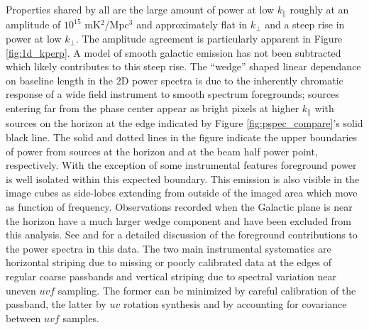 \documentclass[twolcolumn,iop]{emulateapj}
\begin{document}
Properties shared by all are the large amount of power at low $k_{\parallel}$ roughly at an amplitude of $10^{15}$ mK$^2$/Mpc$^3$ and approximately flat in $k_{\perp}$ and a steep rise in power at low $k_\perp$. The amplitude agreement is particularly apparent in Figure \ref{fig:1d_kperp}. A model of smooth galactic emission has not been subtracted which likely contributes to this steep rise. The ``wedge'' shaped linear dependance on baseline length in the 2D power spectra is due to the inherently chromatic response of a wide field instrument to smooth spectrum foregrounds; sources entering far from the phase center appear as bright pixels at higher $k_\parallel$ with sources on the horizon at the edge indicated by Figure \ref{fig:pspec_compare}'s  solid black line. The solid and dotted lines in the figure indicate the upper boundaries of power from sources at the horizon and at the beam half power point, respectively.  With the exception of some instrumental features foreground power is well isolated within this expected boundary. This emission is also visible in the image cubes as side-lobes extending from outside of the imaged area which move as function of frequency.  Observations recorded when the Galactic plane is near the horizon have a much larger wedge component and have been excluded from this analysis. See \cite{2015ApJ...804...14T} and \cite{2015ApJ...807L..28T} for a detailed discussion of the foreground contributions to the power spectra in this data. 
The two main instrumental systematics are horizontal striping due to missing or poorly calibrated data at the edges of regular coarse passbands and vertical striping due to spectral variation near uneven $uvf$ sampling. The former can be minimized by careful calibration of the passband, the latter by $uv$ rotation synthesis and by accounting for covariance between $uvf$ samples. 
\end{document}
